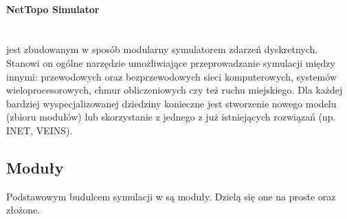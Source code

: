 \paragraph{NetTopo Simulator}
\section{\omnetpp}
\omnetpp jest zbudowanym w sposób modularny symulatorem zdarzeń dyskretnych. Stanowi on ogólne narzędzie umożliwiające przeprowadzanie symulacji między innymi: przewodowych oraz bezprzewodowych sieci komputerowych, systemów wieloprocesorowych, chmur obliczeniowych czy też ruchu miejskiego. Dla każdej bardziej wyspecjalizowanej dziedziny konieczne jest stworzenie nowego modelu (zbioru modułów) lub skorzystanie z jednego z już istniejących rozwiązań (np. INET, VEINS).\cite{Varga2017}
\subsection{Moduły}
Podstawowym budulcem symulacji w \omnetpp są moduły. Dzielą się one na proste oraz złożone.

